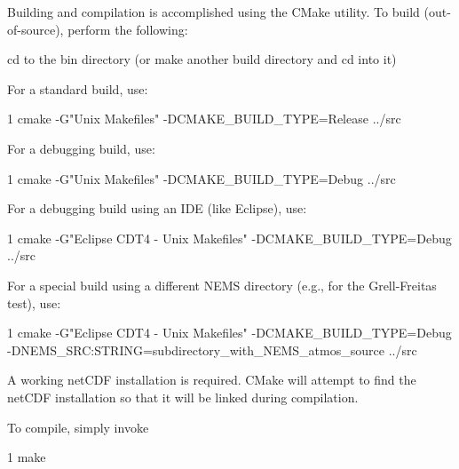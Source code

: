\begin{DoxyItemize}
\item Building and compilation is accomplished using the C\+Make utility. To build (out-\/of-\/source), perform the following\+:
\begin{DoxyEnumerate}
\item cd to the bin directory (or make another build directory and cd into it)
\item For a standard build, use\+:
\begin{DoxyCode}
1 cmake -G"Unix Makefiles" -DCMAKE\_BUILD\_TYPE=Release ../src 
\end{DoxyCode}

\item For a debugging build, use\+:
\begin{DoxyCode}
1 cmake -G"Unix Makefiles" -DCMAKE\_BUILD\_TYPE=Debug ../src 
\end{DoxyCode}

\item For a debugging build using an I\+DE (like Eclipse), use\+:
\begin{DoxyCode}
1 cmake -G"Eclipse CDT4 - Unix Makefiles" -DCMAKE\_BUILD\_TYPE=Debug ../src 
\end{DoxyCode}

\item For a special build using a different N\+E\+MS directory (e.\+g., for the Grell-\/\+Freitas test), use\+:
\begin{DoxyCode}
1 cmake -G"Eclipse CDT4 - Unix Makefiles" -DCMAKE\_BUILD\_TYPE=Debug
       -DNEMS\_SRC:STRING=subdirectory\_with\_NEMS\_atmos\_source ../src 
\end{DoxyCode}

\end{DoxyEnumerate}
\item A working net\+C\+DF installation is required. C\+Make will attempt to find the net\+C\+DF installation so that it will be linked during compilation.
\item To compile, simply invoke
\begin{DoxyCode}
1 make 
\end{DoxyCode}

\end{DoxyItemize}

